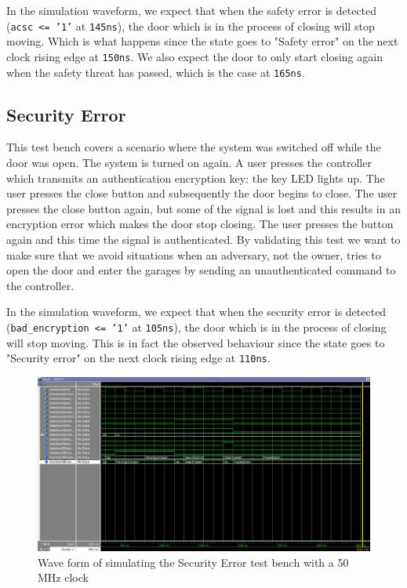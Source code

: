 \documentclass[a4paper,11pt]{article}
\begin{document}
	\par In the simulation waveform, we expect that when the safety error is detected (\texttt{acsc <= '1'} at \texttt{145ns}), the door which is in the process of closing will stop moving. Which is what happens since the state goes to "Safety error" on the next clock rising edge at \texttt{150ns}. We also expect the door to only start closing again when the safety threat has passed, which is the case at \texttt{165ns}.
	
	\subsection{Security Error}
	
	\par This test bench covers a scenario where the system was switched off while the door was open. The system is turned on again. A user presses the controller which transmits an authentication encryption key: the key LED lights up. The user presses the close button and subsequently the door begins to close. The user presses the close button again, but some of the signal is lost and this results in an encryption error which makes the door stop closing. The user presses the button again and this time the signal is authenticated. By validating this test we want to make sure that we avoid situations when an adversary, not the owner, tries to open the door and enter the garages by sending an unauthenticated command to the controller.
	\newline
	\par In the simulation waveform, we expect that when the security error is detected (\texttt{bad\_encryption <= '1'} at \texttt{105ns}), the door which is in the process of closing will stop moving. This is in fact the observed behaviour since the state goes to "Security error" on the next clock rising edge at \texttt{110ns}.
    
    \begin{figure}[H]
      \centering
      \includegraphics[width=0.9\linewidth]{scenarioSecurity.png}  
      \caption{Wave form of simulating the Security Error test bench with a 50 MHz clock}
    \end{figure}
    
\end{document}
